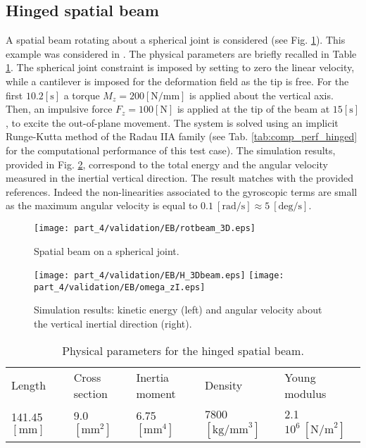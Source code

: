 \subsection{Hinged spatial beam}
A spatial beam rotating about a spherical joint is considered (see Fig. \ref{fig:beam_3D}). This example was considered in \cite{cardona2000,ellenbroek2018}. The physical parameters are briefly recalled in Table \ref{tab:data_3Dbeam}. The spherical joint constraint is imposed by setting to zero the linear velocity, while a cantilever is imposed for the deformation field as the tip is free. For the first $10.2 [\mathrm{s}]$ a torque $ M_z =200 [\mathrm{N/mm}]$ is applied about the vertical axis. Then, an impulsive force $ F_z =100 [\mathrm{N}]$ is applied at the tip of the beam at $15 [\mathrm{s}]$, to excite the out-of-plane movement. The system is solved using an implicit Runge-Kutta method of the Radau IIA family {(see Tab. \ref{tab:comp_perf_hinged} for the computational performance of this test case)}. The simulation results, provided in Fig. \ref{fig:H_omega}, correspond to the total energy and the angular velocity measured in the inertial vertical direction. The result matches with the provided references. Indeed the non-linearities associated to the gyroscopic terms are small as the maximum angular velocity is equal to $0.1 \ [\mathrm{rad/s}] \approx 5 \ [\mathrm{deg/s}]$. 

\begin{figure}[tb]
	\centering
	\texttt{[image: part\_4/validation/EB/rotbeam\_3D.eps]} 
	\caption{Spatial beam on a spherical joint.}
	\label{fig:beam_3D}
\end{figure}

\begin{figure}[tb]
	\centering
	\texttt{[image: part\_4/validation/EB/H\_3Dbeam.eps]} 
	\texttt{[image: part\_4/validation/EB/omega\_zI.eps]} 
	\caption{Simulation results: kinetic energy (left) and angular velocity about the vertical inertial direction (right).}
	\label{fig:H_omega}
\end{figure}

\begin{table}[tb]
	\centering
	\caption{Physical parameters for the hinged spatial beam.}
	\label{tab:data_3Dbeam}       %
	\begin{tabular}{lllll}
		\hline\noalign{\smallskip}
		Length & Cross section & Inertia moment & Density & Young modulus \\
		\noalign{\smallskip}\hline\noalign{\smallskip}
		141.45 $[\mathrm{mm}]$ & 9.0 $[\mathrm{mm}^2]$ & 6.75 $[\mathrm{mm}^4]$ & 7800 $[\mathrm{kg/mm}^3]$ & 2.1 $10^6 \ [\mathrm{N/m}^2]$  \\
		\hline
	\end{tabular}
\end{table}


